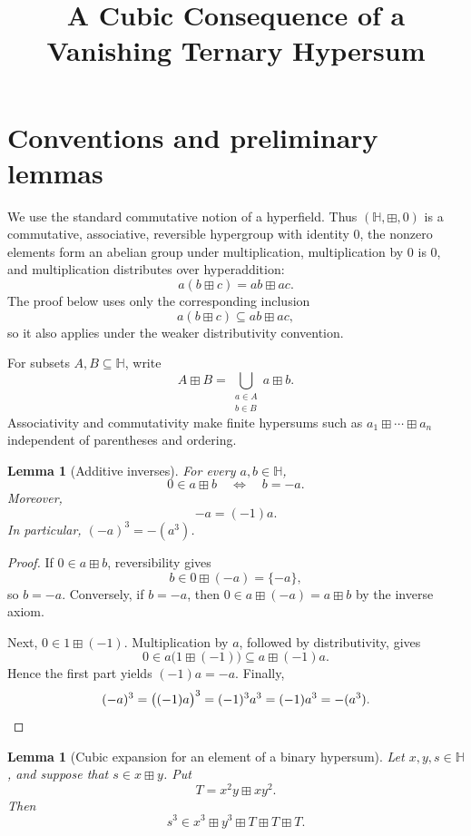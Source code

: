 \documentclass[11pt]{amsart}
\title{A Cubic Consequence of a Vanishing Ternary Hypersum}
\date{}
\newtheorem{lemma}[theorem]{Lemma}
\newcommand{\hs}{\boxplus}
\begin{document}
\maketitle

\section{Conventions and preliminary lemmas}

We use the standard commutative notion of a hyperfield. Thus
\((\mathbb H,\hs,0)\) is a commutative, associative, reversible hypergroup
with identity \(0\), the nonzero elements form an abelian group under
multiplication, multiplication by \(0\) is \(0\), and multiplication
distributes over hyperaddition:
\[
a(b\hs c)=ab\hs ac.
\]
The proof below uses only the corresponding inclusion
\[
a(b\hs c)\subseteq ab\hs ac,
\]
so it also applies under the weaker distributivity convention.

For subsets \(A,B\subseteq\mathbb H\), write
\[
A\hs B=\bigcup_{\substack{a\in A\\ b\in B}}a\hs b.
\]
Associativity and commutativity make finite hypersums such as
\(a_1\hs\cdots\hs a_n\) independent of parentheses and ordering.

\begin{lemma}[Additive inverses]
\label{lem:additive-inverses}
For every \(a,b\in\mathbb H\),
\[
0\in a\hs b
\quad\Longleftrightarrow\quad
b=-a.
\]
Moreover,
\[
-a=(-1)a.
\]
In particular, \((-a)^3=-(a^3)\).
\end{lemma}

\begin{proof}
If \(0\in a\hs b\), reversibility gives
\[
b\in 0\hs(-a)=\{-a\},
\]
so \(b=-a\). Conversely, if \(b=-a\), then \(0\in a\hs(-a)=a\hs b\)
by the inverse axiom.

Next, \(0\in1\hs(-1)\). Multiplication by \(a\), followed by
distributivity, gives
\[
0\in a\bigl(1\hs(-1)\bigr)\subseteq a\hs(-1)a.
\]
Hence the first part yields \((-1)a=-a\). Finally,
\[
(-a)^3=\bigl((-1)a\bigr)^3=(-1)^3a^3=(-1)a^3=-(a^3).
\qedhere
\]
\end{proof}

\begin{lemma}[Cubic expansion for an element of a binary hypersum]
\label{lem:cubic-expansion}
Let \(x,y,s\in\mathbb H\), and suppose that \(s\in x\hs y\). Put
\[
T=x^2y\hs xy^2.
\]
Then
\[
s^3\in x^3\hs y^3\hs T\hs T\hs T.
\]
\end{lemma}
\end{document}
